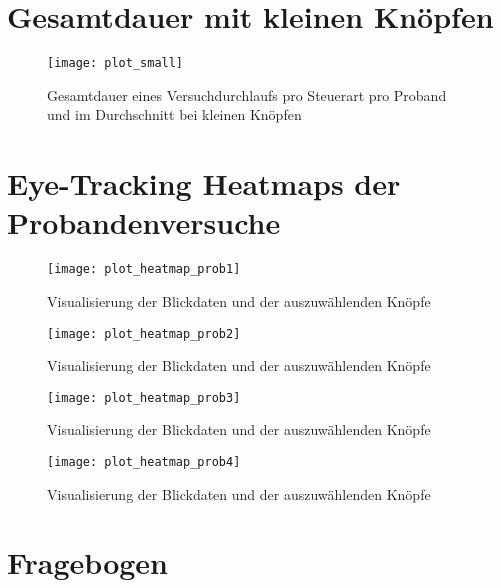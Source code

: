 \clearpage
\section{Gesamtdauer mit kleinen Knöpfen}
\label{appendix:timessmall}
\begin{figure}[!htbp]
	\centering
	\texttt{[image: plot\_small]}
	\caption[Gesamtdauer eines Versuchdurchlaufs pro Steuerart pro Proband und im Durchschnitt bei kleinen Knöpfen] {Gesamtdauer eines Versuchdurchlaufs pro Steuerart pro Proband und im Durchschnitt bei kleinen Knöpfen}
\end{figure}

\clearpage
\section{Eye-Tracking Heatmaps der Probandenversuche}
\label{appendix:heatmaps}
\begin{figure}[!htbp]
	\centering
	\texttt{[image: plot\_heatmap\_prob1]}
	\caption[Visualisierung der Blickdaten und der auszuwählenden Knöpfe] {Visualisierung der Blickdaten und der auszuwählenden Knöpfe}
\end{figure}
\begin{figure}[!htbp]
	\centering
	\texttt{[image: plot\_heatmap\_prob2]}
	\caption[Visualisierung der Blickdaten und der auszuwählenden Knöpfe] {Visualisierung der Blickdaten und der auszuwählenden Knöpfe}
\end{figure}
\begin{figure}[!htbp]
	\centering
	\texttt{[image: plot\_heatmap\_prob3]}
	\caption[Visualisierung der Blickdaten und der auszuwählenden Knöpfe] {Visualisierung der Blickdaten und der auszuwählenden Knöpfe}
\end{figure}
\begin{figure}[!htbp]
	\centering
	\texttt{[image: plot\_heatmap\_prob4]}
	\caption[Visualisierung der Blickdaten und der auszuwählenden Knöpfe] {Visualisierung der Blickdaten und der auszuwählenden Knöpfe}
\end{figure}

\clearpage
\section{Fragebogen}
